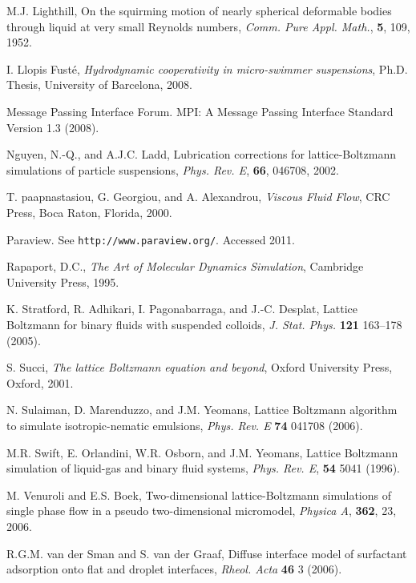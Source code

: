 \begin{thebibliography}{99}
M.J. Lighthill,
On the squirming motion of nearly spherical deformable bodies through
liquid at very small Reynolds numbers,
\textit{Comm. Pure Appl. Math.}, \textbf{5}, 109, 1952.

I. Llopis Fust\'e,
\textit{Hydrodynamic cooperativity in micro-swimmer suspensions},
Ph.D. Thesis, University of Barcelona, 2008.

Message Passing Interface Forum. MPI: A Message Passing Interface Standard
Version 1.3 (2008).

Nguyen, N.-Q., and A.J.C. Ladd, Lubrication corrections for
lattice-Boltzmann simulations of particle suspensions,
\textit{Phys. Rev. E}, \textbf{66}, 046708, 2002.

T. paapnastasiou, G. Georgiou, and A. Alexandrou,
\textit{Viscous Fluid Flow},
CRC Press, Boca Raton, Florida, 2000.

Paraview. See \texttt{http://www.paraview.org/}. Accessed 2011.

Rapaport, D.C., \textit{The Art of Molecular Dynamics Simulation},
Cambridge University Press, 1995.


K. Stratford, R. Adhikari, I. Pagonabarraga, and J.-C. Desplat,
Lattice Boltzmann for binary fluids with suspended colloids,
\textit{J. Stat. Phys.} \textbf{121} 163--178 (2005).

S. Succi, \textit{The lattice Boltzmann equation and beyond},
Oxford University Press, Oxford, 2001.

N. Sulaiman, D. Marenduzzo, and J.M. Yeomans,
Lattice Boltzmann algorithm to simulate isotropic-nematic emulsions,
\textit{Phys. Rev. E} \textbf{74} 041708 (2006).

M.R. Swift, E. Orlandini, W.R. Osborn, and J.M. Yeomans,
Lattice Boltzmann simulation of liquid-gas and binary fluid systems,
\textit{Phys. Rev. E}, \textbf{54} 5041 (1996).

M. Venuroli and E.S. Boek,
Two-dimensional lattice-Boltzmann simulations of single phase
flow in a pseudo two-dimensional micromodel,
\textit{Physica A}, \textbf{362}, 23, 2006.

R.G.M. van der Sman and S. van der Graaf,
Diffuse interface model of surfactant adsorption onto flat and
droplet interfaces,
\textit{Rheol. Acta} \textbf{46} 3 (2006).


\end{thebibliography}
